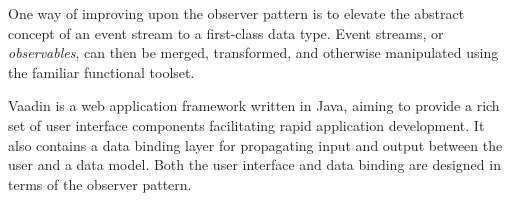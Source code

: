 One way of improving upon the observer pattern is to elevate the abstract concept of an event stream to a first-class data type. Event streams, or \emph{observables}, can then be merged, transformed, and otherwise manipulated using the familiar functional toolset.

Vaadin is a web application framework written in Java, aiming to provide a rich set of user interface components facilitating rapid application development. It also contains a data binding layer for propagating input and output between the user and a data model. Both the user interface and data binding are designed in terms of the observer pattern. 